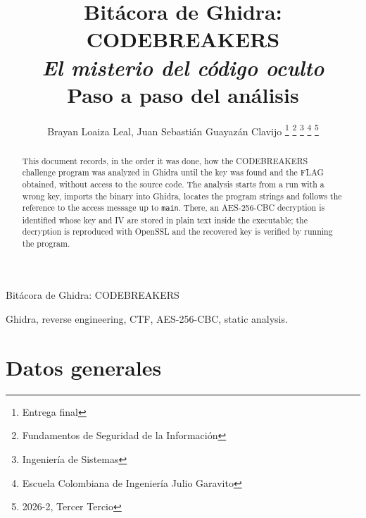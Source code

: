 \documentclass[journal]{IEEEtran}
\begin{document}

\title{Bit\'acora de Ghidra: CODEBREAKERS\\
\large \textit{El misterio del c\'odigo oculto}\\
\normalsize Paso a paso del an\'alisis}

\author{Brayan Loaiza Leal,
Juan Sebasti\'an Guayaz\'an Clavijo
\thanks{Entrega final}
\thanks{Fundamentos de Seguridad de la Informaci\'on}
\thanks{Ingenier\'ia de Sistemas}
\thanks{Escuela Colombiana de Ingenier\'ia Julio Garavito}
\thanks{2026-2, Tercer Tercio}}

%
{Bit\'acora de Ghidra: CODEBREAKERS}

\maketitle

\begin{otherlanguage}{english}
\begin{abstract}
This document records, in the order it was done, how the CODEBREAKERS challenge
program was analyzed in Ghidra until the key was found and the FLAG obtained,
without access to the source code. The analysis starts from a run with a wrong
key, imports the binary into Ghidra, locates the program strings and follows the
reference to the access message up to \texttt{main}. There, an AES-256-CBC
decryption is identified whose key and IV are stored in plain text inside the
executable; the decryption is reproduced with OpenSSL and the recovered key is
verified by running the program.
\end{abstract}

\begin{IEEEkeywords}
Ghidra, reverse engineering, CTF, AES-256-CBC, static analysis.
\end{IEEEkeywords}
\end{otherlanguage}

\IEEEpeerreviewmaketitle

\section{Datos generales}
\end{document}
